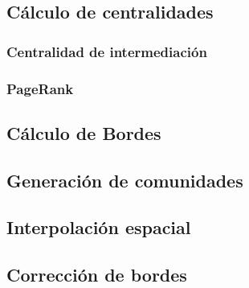 \documentclass[12pt]{article}
\begin{document}
	\subsection{Cálculo de centralidades}	
		\subsubsection{Centralidad de intermediación}
		\subsubsection{PageRank}
	
	\subsection{Cálculo de Bordes}
	
	\subsection{Generación de comunidades}
	\subsection{Interpolación espacial}
	
	\subsection{Corrección de bordes}    
    
    \newpage
    
    
    
\end{document}
